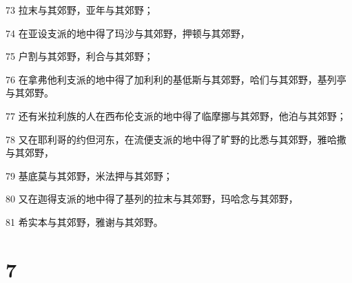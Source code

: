 \par 73 拉末与其郊野，亚年与其郊野；
\par 74 在亚设支派的地中得了玛沙与其郊野，押顿与其郊野，
\par 75 户割与其郊野，利合与其郊野；
\par 76 在拿弗他利支派的地中得了加利利的基低斯与其郊野，哈们与其郊野，基列亭与其郊野。
\par 77 还有米拉利族的人在西布伦支派的地中得了临摩挪与其郊野，他泊与其郊野；
\par 78 又在耶利哥的约但河东，在流便支派的地中得了旷野的比悉与其郊野，雅哈撒与其郊野，
\par 79 基底莫与其郊野，米法押与其郊野；
\par 80 又在迦得支派的地中得了基列的拉末与其郊野，玛哈念与其郊野，
\par 81 希实本与其郊野，雅谢与其郊野。

\chapter{7}

